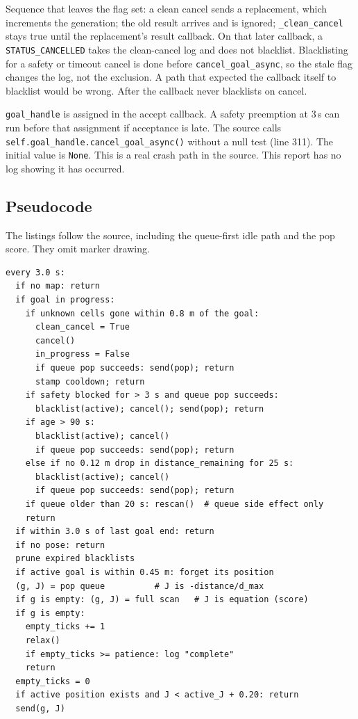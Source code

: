 \documentclass[11pt]{article}
\begin{document}
Sequence that leaves the flag set: a clean cancel sends a replacement, which increments the generation; the old result arrives and is ignored; \texttt{\_clean\_cancel} stays true until the replacement's result callback. On that later callback, a \texttt{STATUS\_CANCELLED} takes the clean-cancel log and does not blacklist. Blacklisting for a safety or timeout cancel is done before \texttt{cancel\_goal\_async}, so the stale flag changes the log, not the exclusion. A path that expected the callback itself to blacklist would be wrong. After  the callback never blacklists on cancel.

\texttt{goal\_handle} is assigned in the accept callback. A safety preemption at 3\,s can run before that assignment if acceptance is late. The source calls \texttt{self.goal\_handle.cancel\_goal\_async()} without a null test (line 311). The initial value is \texttt{None}. This is a real crash path in the source. This report has no log showing it has occurred.

\subsection{Pseudocode}
The listings follow the source, including the queue-first idle path and the pop score. They omit marker drawing.

\begin{lstlisting}[caption={Idle and in-progress tick, abridged only by marker calls.},label={lst:tick}]
every 3.0 s:
  if no map: return
  if goal in progress:
    if unknown cells gone within 0.8 m of the goal:
      clean_cancel = True
      cancel()
      in_progress = False
      if queue pop succeeds: send(pop); return
      stamp cooldown; return
    if safety blocked for > 3 s and queue pop succeeds:
      blacklist(active); cancel(); send(pop); return
    if age > 90 s:
      blacklist(active); cancel()
      if queue pop succeeds: send(pop); return
    else if no 0.12 m drop in distance_remaining for 25 s:
      blacklist(active); cancel()
      if queue pop succeeds: send(pop); return
    if queue older than 20 s: rescan()  # queue side effect only
    return
  if within 3.0 s of last goal end: return
  if no pose: return
  prune expired blacklists
  if active goal is within 0.45 m: forget its position
  (g, J) = pop queue          # J is -distance/d_max
  if g is empty: (g, J) = full scan   # J is equation (score)
  if g is empty:
    empty_ticks += 1
    relax()
    if empty_ticks >= patience: log "complete"
    return
  empty_ticks = 0
  if active position exists and J < active_J + 0.20: return
  send(g, J)
\end{lstlisting}
\end{document}

